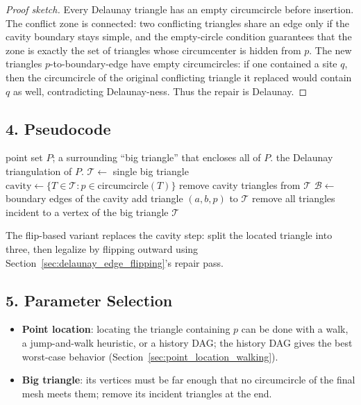\begin{proof}[Proof sketch]
Every Delaunay triangle has an empty circumcircle before insertion. The
conflict zone is connected: two conflicting triangles share an edge only if the
cavity boundary stays simple, and the empty-circle condition guarantees that
the zone is exactly the set of triangles whose circumcenter is hidden from $p$.
The new triangles $p$-to-boundary-edge have empty circumcircles: if one
contained a site $q$, then the circumcircle of the original conflicting
triangle it replaced would contain $q$ as well, contradicting Delaunay-ness.
Thus the repair is Delaunay.
\end{proof}

\subsection{4. Pseudocode}

\begin{algorithm}[htbp]
\caption{Bowyer--Watson Incremental Insertion}
\label{alg:bowyer_watson}
\begin{algorithmic}[1]
\Require point set $P$; a surrounding ``big triangle'' that encloses all of $P$.
\Ensure the Delaunay triangulation of $P$.
  \State $\mathcal{T} \gets $ single big triangle
    \State $\text{cavity} \gets \{ T \in \mathcal{T} : p \in \text{circumcircle}(T) \}$
    \State remove cavity triangles from $\mathcal{T}$
    \State $\mathcal{B} \gets $ boundary edges of the cavity
      \State add triangle $(a,b,p)$ to $\mathcal{T}$
    \EndFor
  \EndFor
  \State remove all triangles incident to a vertex of the big triangle
  \State \Return $\mathcal{T}$
\EndFunction
\end{algorithmic}
\end{algorithm}

The flip-based variant replaces the cavity step: split the located triangle
into three, then legalize by flipping outward using
Section~\ref{sec:delaunay_edge_flipping}'s repair pass.

\subsection{5. Parameter Selection}

\begin{itemize}
\item \textbf{Point location}: locating the triangle containing $p$ can be done
  with a walk, a jump-and-walk heuristic, or a history DAG; the history DAG
  gives the best worst-case behavior (Section~\ref{sec:point_location_walking}).
\item \textbf{Big triangle}: its vertices must be far enough that no circumcircle
  of the final mesh meets them; remove its incident triangles at the end.
\end{itemize}

